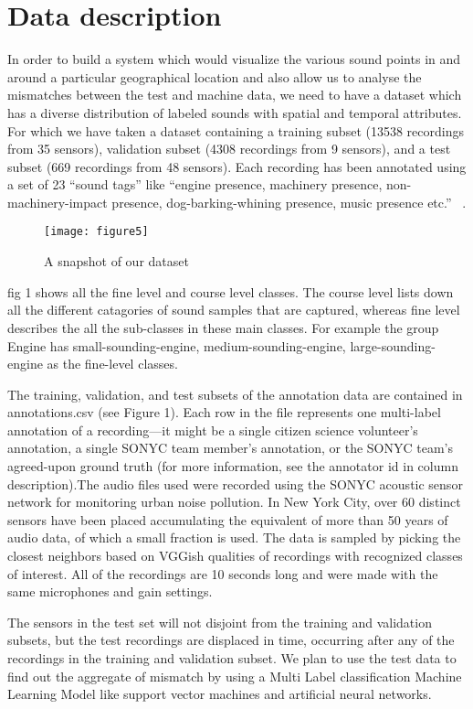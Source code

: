 \section{Data description}
In order to build a system which would visualize the various sound points in and around a particular geographical location and also allow us to analyse the mismatches between the test and machine data, we need to have a dataset which has a diverse distribution of labeled sounds with spatial and temporal attributes. For which we have taken a dataset containing a training subset (13538 recordings from 35 sensors), validation subset (4308 recordings from 9 sensors), and a test subset (669 recordings from 48 sensors). Each recording has been annotated using a set of 23 “sound tags” like “engine presence, machinery presence, non-machinery-impact presence, dog-barking-whining presence, music presence etc.”  ~\cite{4}.

	\begin{figure}[h!]
	\texttt{[image: figure5]}
	\caption{A snapshot of our dataset}
\end{figure}

fig 1 shows all the fine level and course level classes. The course level lists down all the different catagories of  sound samples that are captured, whereas fine level describes the all the sub-classes in these main classes. For example the group Engine has small-sounding-engine, medium-sounding-engine, large-sounding-engine as the fine-level classes.

The training, validation, and test subsets of the annotation data are contained in annotations.csv (see Figure 1). Each row in the file represents one multi-label annotation of a recording—it might be a single citizen science volunteer's annotation, a single SONYC team member's annotation, or the SONYC team's agreed-upon ground truth (for more information, see the annotator id in column description).The audio files used were recorded using the SONYC acoustic sensor network for monitoring urban noise pollution. In New York City, over 60 distinct sensors have been placed accumulating the equivalent of more than 50 years of audio data, of which a small fraction is used. The data is sampled by picking the closest neighbors based on VGGish qualities of recordings with recognized classes of interest. All of the recordings are 10 seconds long and were made with the same microphones and gain settings. 

The sensors in the test set will not disjoint from the training and validation subsets, but the test recordings are displaced in time, occurring after any of the recordings in the training and validation subset. We plan to use the test data to find out the aggregate of mismatch by using a Multi Label classification Machine Learning Model like support vector machines and artificial neural networks.

